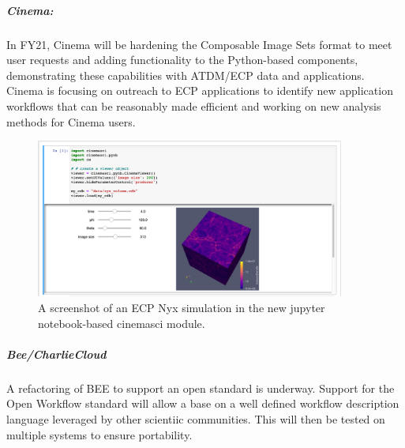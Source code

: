 \subparagraph{Cinema:}
In FY21, Cinema will be hardening the Composable Image Sets format to meet user requests and adding functionality to the Python-based components, demonstrating these capabilities with ATDM/ECP data and applications.  Cinema is focusing on outreach to ECP applications to identify new application workflows that can be reasonably made efficient and working on new analysis methods for Cinema users.


\begin{figure}[htb]
	\centering
	\includegraphics[width=4in]{projects/2.3.6-NNSA/2.3.6.01-LANL-ATDM/cinema-jnc-nyx-volume.png}
	\caption{
		A screenshot of an ECP Nyx simulation in the new jupyter notebook-based cinemasci module.  
	\label{fig:cinemasci-nyxexample}
	}
\end{figure}

\subparagraph{Bee/CharlieCloud}
A refactoring of BEE to support an open standard is underway. Support for the Open Workflow standard will allow a base on a well defined workflow description language leveraged by other scientiic communities. This will then be tested on multiple systems to ensure portability.
